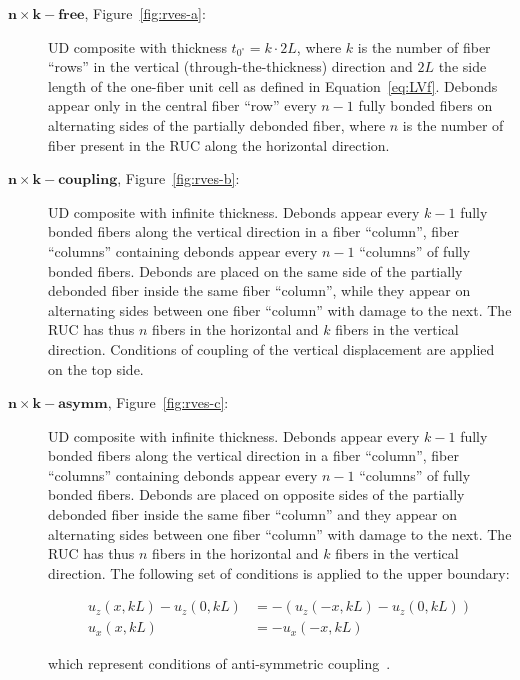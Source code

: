 \documentclass[12pt,a4paper]{article}
\begin{document}
\begin{description}
\item [$\mathbf{n\times k-free}$, Figure~\ref{fig:rves-a}: ]UD composite with thickness $t_{0^{\circ}}=k\cdot2L$, where $k$ is the number of fiber ``rows'' in the vertical (through-the-thickness) direction and $2L$ the side length of the one-fiber unit cell as defined in Equation~\ref{eq:LVf}. Debonds appear only in the central fiber ``row'' every $n-1$ fully bonded fibers on alternating sides of the partially debonded fiber, where $n$ is the number of fiber present in the RUC along the horizontal direction.
\item [$\mathbf{n\times k-coupling}$, Figure~\ref{fig:rves-b}: ]UD composite with infinite thickness. Debonds appear every $k-1$ fully bonded fibers along the vertical direction in a fiber ``column'', fiber ``columns'' containing debonds appear every $n-1$ ``columns'' of fully bonded fibers. Debonds are placed on the same side of the partially debonded fiber inside the same fiber ``column'', while they appear on alternating sides between one fiber ``column'' with damage to the next. The RUC has thus $n$ fibers in the horizontal and $k$ fibers in the vertical direction. Conditions of coupling of the vertical displacement are applied on the top side.
\item [$\mathbf{n\times k-asymm}$, Figure~\ref{fig:rves-c}: ]UD composite with infinite thickness. Debonds appear every $k-1$ fully bonded fibers along the vertical direction in a fiber ``column'', fiber ``columns'' containing debonds appear every $n-1$ ``columns'' of fully bonded fibers. Debonds are placed on opposite sides of the partially debonded fiber inside the same fiber ``column'' and they appear on alternating sides between one fiber ``column'' with damage to the next. The RUC has thus $n$ fibers in the horizontal and $k$ fibers in the vertical direction. The following set of conditions is applied to the upper boundary:

\begin{equation}\label{eq:asymm}
\begin{aligned}
u_{z}\left(x,kL\right)-u_{z}\left(0,kL\right)&=-\left(u_{z}\left(-x,kL\right)-u_{z}\left(0,kL\right)\right)\\
u_{x}\left(x,kL\right)&=-u_{x}\left(-x,kL\right)
\end{aligned}
\end{equation}

which represent conditions of anti-symmetric coupling~\cite{DiStasio2019b}.


\end{description}
\end{document}
